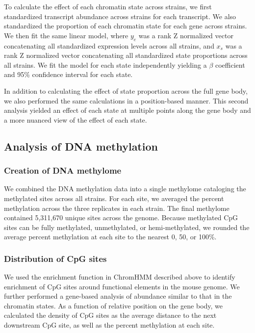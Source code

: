 \documentclass[10pt,letterpaper]{article}
\begin{document}
To calculate the effect of each chromatin state across strains, we first
standardized transcript abundance across strains for each transcript. We
also standardized the proportion of each chromatin state for each gene
across strains. We then fit the same linear model, where \(y_{e}\) was a
rank Z normalized vector concatenating all standardized expression
levels across all strains, and \(x_{s}\) was a rank Z normalized vector
concatenating all standardized state proportions across all strains. We
fit the model for each state independently yielding a \(\beta\)
coefficient and 95\% confidence interval for each state.

In addition to calculating the effect of state proportion across the
full gene body, we also performed the same calculations in a
position-based manner. This second analysis yielded an effect of each
state at multiple points along the gene body and a more nuanced view of
the effect of each state.

\hypertarget{analysis-of-dna-methylation}{%
\subsection{Analysis of DNA
methylation}\label{analysis-of-dna-methylation}}

\hypertarget{creation-of-dna-methylome}{%
\subsubsection{Creation of DNA
methylome}\label{creation-of-dna-methylome}}

We combined the DNA methylation data into a single methylome cataloging
the methylated sites across all strains. For each site, we averaged the
percent methylation across the three replicates in each strain. The
final methylome contained 5,311,670 unique sites across the genome.
Because methylated CpG sites can be fully methylated, unmethylated, or
hemi-methylated, we rounded the average percent methylation at each site
to the nearest 0, 50, or 100\%.

\hypertarget{distribution-of-cpg-sites}{%
\subsubsection{Distribution of CpG
sites}\label{distribution-of-cpg-sites}}

We used the enrichment function in ChromHMM described above to identify
enrichment of CpG sites around functional elements in the mouse genome.
We further performed a gene-based analysis of abundance similar to that
in the chromatin states. As a function of relative position on the gene
body, we calculated the density of CpG sites as the average distance to
the next downstream CpG site, as well as the percent methylation at each
site.
\end{document}
